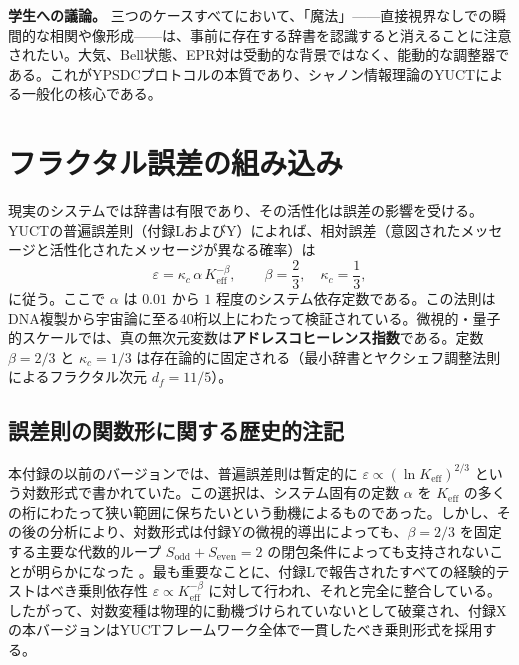 \documentclass[12pt,a4paper]{article}
\theoremstyle{definition}
\theoremstyle{remark}
\begin{document}
	\vspace{0.2cm}
	\noindent\textbf{学生への議論。} 
	三つのケースすべてにおいて、「魔法」——直接視界なしでの瞬間的な相関や像形成——は、事前に存在する辞書を認識すると消えることに注意されたい。大気、Bell状態、EPR対は受動的な背景ではなく、能動的な調整器である。これがYPSDCプロトコルの本質であり、シャノン情報理論のYUCTによる一般化の核心である。
	
	\section{フラクタル誤差の組み込み}
	\label{sec:errors}
	
	現実のシステムでは辞書は有限であり、その活性化は誤差の影響を受ける。YUCTの普遍誤差則（付録LおよびY）によれば、相対誤差（意図されたメッセージと活性化されたメッセージが異なる確率）は
	\begin{equation}
		\boxed{\varepsilon = \kappa_c \, \alpha \, K_{\mathrm{eff}}^{-\beta}}, \qquad 
		\beta = \frac{2}{3},\quad \kappa_c = \frac{1}{3},
		\label{eq:error-law-corrected}
	\end{equation}
	に従う。ここで $\alpha$ は $0.01$ から $1$ 程度のシステム依存定数である。この法則はDNA複製から宇宙論に至る40桁以上にわたって検証されている。微視的・量子的スケールでは、真の無次元変数は\textbf{アドレスコヒーレンス指数}である。定数 $\beta = 2/3$ と $\kappa_c = 1/3$ は存在論的に固定される（最小辞書とヤクシェフ調整法則によるフラクタル次元 $d_f = 11/5$）。
	
	\subsection*{誤差則の関数形に関する歴史的注記}
	
	本付録の以前のバージョンでは、普遍誤差則は暫定的に $\varepsilon \propto (\ln K_{\mathrm{eff}})^{2/3}$ という対数形式で書かれていた。この選択は、システム固有の定数 $\alpha$ を $K_{\mathrm{eff}}$ の多くの桁にわたって狭い範囲に保ちたいという動機によるものであった。しかし、その後の分析により、対数形式は付録Yの微視的導出によっても、$\beta=2/3$ を固定する主要な代数的ループ $S_{\mathrm{odd}}+S_{\mathrm{even}}=2$ の閉包条件によっても支持されないことが明らかになった \cite{YakushevLaw2026}。最も重要なことに、付録Lで報告されたすべての経験的テストはべき乗則依存性 $\varepsilon \propto K_{\mathrm{eff}}^{-\beta}$ に対して行われ、それと完全に整合している。したがって、対数変種は物理的に動機づけられていないとして破棄され、付録Xの本バージョンはYUCTフレームワーク全体で一貫したべき乗則形式を採用する。
	
\end{document}
